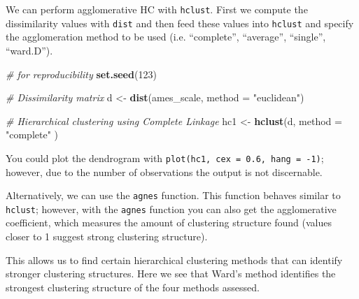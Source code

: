 \documentclass[]{book}
\newenvironment{Shaded}{\begin{snugshade}}{\end{snugshade}}
\newcommand{\CommentTok}[1]{\textcolor[rgb]{0.56,0.35,0.01}{\textit{#1}}}
\newcommand{\DataTypeTok}[1]{\textcolor[rgb]{0.13,0.29,0.53}{#1}}
\newcommand{\DecValTok}[1]{\textcolor[rgb]{0.00,0.00,0.81}{#1}}
\newcommand{\KeywordTok}[1]{\textcolor[rgb]{0.13,0.29,0.53}{\textbf{#1}}}
\newcommand{\NormalTok}[1]{#1}
\newcommand{\OperatorTok}[1]{\textcolor[rgb]{0.81,0.36,0.00}{\textbf{#1}}}
\newcommand{\StringTok}[1]{\textcolor[rgb]{0.31,0.60,0.02}{#1}}
\theoremstyle{definition}
\theoremstyle{definition}
\theoremstyle{definition}
\theoremstyle{remark}
\let\BeginKnitrBlock\begin \let\EndKnitrBlock\end
\begin{document}
We can perform agglomerative HC with \texttt{hclust}. First we compute
the dissimilarity values with \texttt{dist} and then feed these values
into \texttt{hclust} and specify the agglomeration method to be used
(i.e. ``complete'', ``average'', ``single'', ``ward.D'').

\begin{Shaded}
\begin{Highlighting}[]
\CommentTok{# for reproducibility}
\KeywordTok{set.seed}\NormalTok{(}\DecValTok{123}\NormalTok{)}

\CommentTok{# Dissimilarity matrix}
\NormalTok{d <-}\StringTok{ }\KeywordTok{dist}\NormalTok{(ames_scale, }\DataTypeTok{method =} \StringTok{"euclidean"}\NormalTok{)}

\CommentTok{# Hierarchical clustering using Complete Linkage}
\NormalTok{hc1 <-}\StringTok{ }\KeywordTok{hclust}\NormalTok{(d, }\DataTypeTok{method =} \StringTok{"complete"}\NormalTok{ )}
\end{Highlighting}
\end{Shaded}

\BeginKnitrBlock{tip}
You could plot the dendrogram with
\texttt{plot(hc1,\ cex\ =\ 0.6,\ hang\ =\ -1)}; however, due to the
number of observations the output is not discernable.
\EndKnitrBlock{tip}

Alternatively, we can use the \texttt{agnes} function. This function
behaves similar to \texttt{hclust}; however, with the \texttt{agnes}
function you can also get the agglomerative coefficient, which measures
the amount of clustering structure found (values closer to 1 suggest
strong clustering structure).

\begin{Shaded}
\end{Shaded}

This allows us to find certain hierarchical clustering methods that can
identify stronger clustering structures. Here we see that Ward's method
identifies the strongest clustering structure of the four methods
assessed.
\end{document}
